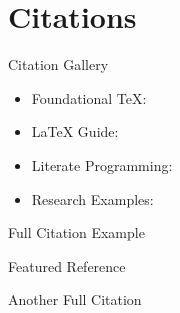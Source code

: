 \section{Citations}

\begin{frame}{Citation Gallery}
    \begin{itemize}
        \item Foundational TeX: \cite{texbook}
        \item LaTeX Guide: \cite{latex2e, latex:companion}
        \item Literate Programming: \cite{knuth:1984}
        \item Research Examples: \cite{FosterEtAl:2003, Alsolami:2012}
    \end{itemize}
\end{frame}

\begin{frame}{Full Citation Example}
    \begin{pinfo}{Featured Reference}
    \end{pinfo}
    
    \begin{pblock}{Another Full Citation}
    \end{pblock}
\end{frame}
